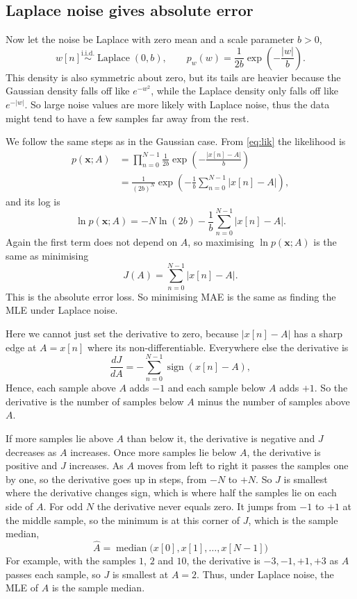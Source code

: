 \documentclass[11pt]{article}
\numberwithin{figure}{section}
\numberwithin{equation}{section}
\begin{document}
\subsection{Laplace noise gives absolute error}

Now let the noise be Laplace with zero mean and a scale parameter $b > 0$,
\[
  w[n] \overset{\text{i.i.d.}}{\sim} \operatorname{Laplace}(0, b), \qquad
  p_w(w) = \frac{1}{2b}\exp\!\left(-\frac{|w|}{b}\right).
\]
This density is also symmetric about zero, but its tails are heavier because the Gaussian density falls off like $e^{-w^2}$, while the Laplace density only falls off like $e^{-|w|}$. So large noise
values are more likely with Laplace noise, thus the data might tend to have a few samples far away from the rest.

We follow the same steps as in the Gaussian case. From \eqref{eq:lik} the likelihood is
\begin{align*}
  p(\mathbf{x}; A) &= \prod_{n=0}^{N-1} \frac{1}{2b}
  \exp\!\left(-\frac{|x[n]-A|}{b}\right) \\
  &= \frac{1}{(2b)^N}
  \exp\!\left(-\frac{1}{b}\sum_{n=0}^{N-1}|x[n]-A|\right),
\end{align*}
and its log is
\[
  \ln p(\mathbf{x}; A) = -N\ln(2b) - \frac{1}{b}\sum_{n=0}^{N-1}|x[n]-A| .
\]
Again the first term does not depend on $A$, so maximising $\ln p(\mathbf{x}; A)$ is the same as
minimising
\[
  J(A) = \sum_{n=0}^{N-1}|x[n]-A| .
\]
This is the absolute error loss. So minimising MAE is the same as finding the MLE under Laplace noise.

Here we cannot just set the derivative to zero, because $|x[n]-A|$ has a sharp edge at $A = x[n]$ where its non-differentiable. Everywhere else the derivative is
\[
  \frac{dJ}{dA} = -\sum_{n=0}^{N-1}\operatorname{sign}(x[n]-A),
\]
Hence, each sample above $A$ adds $-1$ and each sample below $A$ adds $+1$. So the derivative is the number of samples below
$A$ minus the number of samples above $A$.

If more samples lie above $A$ than below it, the derivative is negative and $J$ decreases as $A$
increases. Once more samples lie below $A$, the derivative is positive and $J$ increases. As $A$
moves from left to right it passes the samples one by one, so the derivative goes up in steps,
from $-N$ to $+N$. So $J$ is smallest where the derivative changes sign, which is where half the
samples lie on each side of $A$. For odd $N$ the derivative never equals zero. It jumps from $-1$
to $+1$ at the middle sample, so the minimum is at this corner of $J$, which is the sample median,
\[
  \boxed{\hat A = \operatorname{median}\bigl(x[0], x[1], \dots, x[N-1]\bigr)}
\]
For example, with the samples $1$, $2$ and $10$, the derivative is $-3, -1, +1, +3$ as $A$ passes
each sample, so $J$ is smallest at $A = 2$. Thus, under Laplace noise, the MLE of $A$ is the sample median. 
\end{document}
